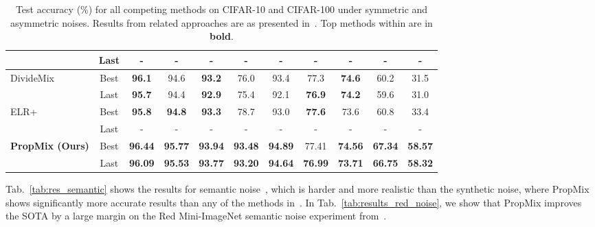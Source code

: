 \documentclass{bmvc2k}
\begin{document}
\begin{table*}[t!]
{\begin{tabular}{lc|cccc|c||cccc}
  & Last & - & - & - & - & - &  - & - & - & - \\
\hline
\multirow{2}{*}{DivideMix \citep{DivideMix}}& Best & \textbf{96.1} & 94.6 & \textbf{93.2} & 76.0& 93.4  & 77.3 & \textbf{74.6} & 60.2 & 31.5 \\
  & Last & \textbf{95.7} & 94.4 & \textbf{92.9} & 75.4& 92.1  & \textbf{76.9} & \textbf{74.2} & 59.6 & 31.0 \\
\hline
\multirow{2}{*}{ELR+~\citep{liu2020early}}& Best & \textbf{95.8} & \textbf{94.8} & \textbf{93.3} & 78.7& 93.0 &  \textbf{77.6} & 73.6 & 60.8 & 33.4 \\
  & Last & - & - & - & - & - &  - & - & - & - \\
\hline



\multirow{2}{*}{\textbf{PropMix (Ours)}}& Best & \textbf{96.44} & \textbf{95.77} & \textbf{93.94} & \textbf{93.48} & \textbf{94.89} &  77.41 & \textbf{74.56} & \textbf{67.34} & \textbf{58.57}\\
    & Last & \textbf{96.09} & \textbf{95.53} & \textbf{93.77} & \textbf{93.20} & \textbf{94.64} &  \textbf{76.99} & \textbf{73.71} & \textbf{66.75} & \textbf{58.32}\\
\hline
\end{tabular}
}
\caption{Test accuracy (\%) for all competing methods on CIFAR-10 and CIFAR-100 under symmetric and asymmetric noises. Results from related approaches are as presented in~\citep{DivideMix}. 
Top methods within  are in \textbf{bold}.} 
\label{tab:results_cifar}
\end{table*}

Tab.~\ref{tab:res_semantic} shows the results for semantic noise~\citep{rog}, which is harder and more realistic than the synthetic noise, where PropMix shows significantly more accurate results than any of the methods in~\citep{rog}. 
In Tab.~\ref{tab:results_red_noise}, we show that PropMix improves the SOTA by a large margin on the Red Mini-ImageNet semantic noise experiment from~\citep{jiang2020beyond}.
\end{document}
